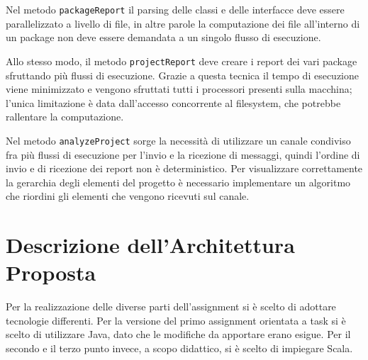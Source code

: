 \documentclass[12pt,a4paper,openright,twoside]{book}
\begin{document}
Nel metodo \texttt{packageReport} il parsing delle classi e delle interfacce deve essere parallelizzato a livello di file, in altre parole la computazione dei file all'interno di un package non deve essere demandata a un singolo flusso di esecuzione.

Allo stesso modo, il metodo \texttt{projectReport} deve creare i report dei vari package sfruttando più flussi di esecuzione.
Grazie a questa tecnica il tempo di esecuzione viene minimizzato e vengono sfruttati tutti i processori presenti sulla macchina; l'unica limitazione è data dall'accesso concorrente al filesystem, che potrebbe rallentare la computazione.

Nel metodo \texttt{analyzeProject} sorge la necessità di utilizzare un canale condiviso fra più flussi di esecuzione per l'invio e la ricezione di messaggi, quindi l'ordine di invio e di ricezione dei report non è deterministico.
Per visualizzare correttamente la gerarchia degli elementi del progetto è necessario implementare un algoritmo che riordini gli elementi che vengono ricevuti sul canale.
\chapter{Descrizione dell'Architettura Proposta}
\label{chap:Descrizione dell'Architettura Proposta}
Per la realizzazione delle diverse parti dell'assignment si è scelto di adottare tecnologie differenti.
Per la versione del primo assignment orientata a task si è scelto di utilizzare Java, dato che le modifiche da apportare erano esigue.
Per il secondo e il terzo punto invece, a scopo didattico, si è scelto di impiegare Scala.
\end{document}

